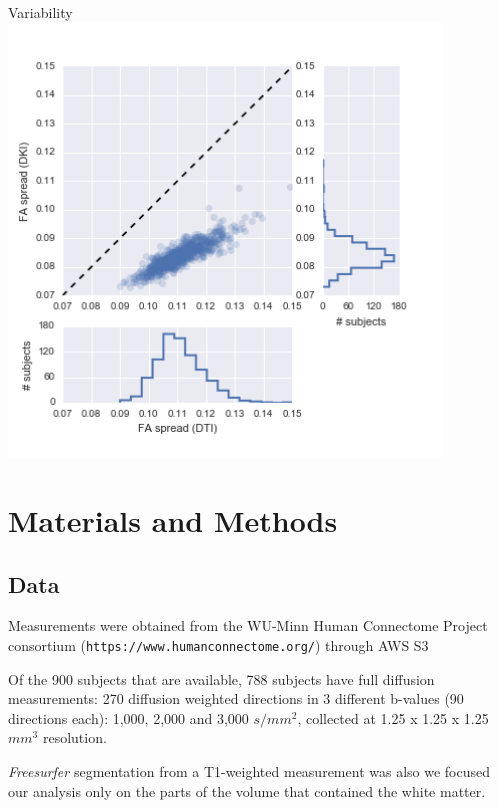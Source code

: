 \documentclass[a0, landscape]{a0poster}
\begin{document}
\begin{multicols}{3}
\begin{minipage}[b]{1\linewidth}
\begin{minipage}[b]{0.33\linewidth}
  \end{minipage}
  \begin{minipage}[b]{0.33\linewidth}
    \center Variability\\
  \includegraphics[width=11.5cm]{fa_spread.png}
  \end{minipage}
\end{minipage}

\normalsize
\section*{Materials and Methods}
\vspace{-10mm}
\subsection*{Data}
Measurements were obtained from the WU-Minn Human Connectome Project consortium
(\texttt{https://www.humanconnectome.org/}) through AWS S3

\noindent Of the 900 subjects that are available, 788 subjects have full
diffusion measurements: 270 diffusion weighted directions in 3 different
b-values (90 directions each): 1,000, 2,000 and 3,000 $s/mm^2$, collected at
1.25 x 1.25 x 1.25 $mm^3$ resolution.

\noindent \emph{Freesurfer} segmentation from a T1-weighted measurement was also
we focused our analysis only on the parts of the volume that contained the white
matter.
\vspace{-10mm}



\end{multicols}
\end{document}
